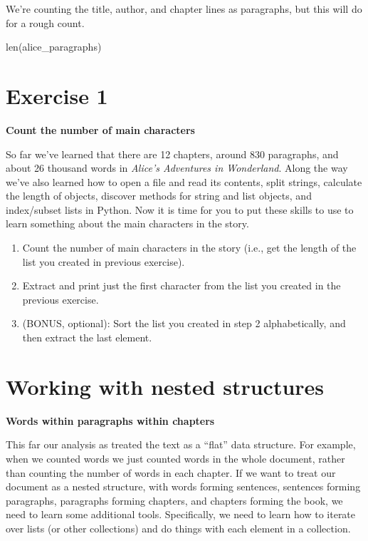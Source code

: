 \documentclass[]{book}
\newenvironment{Shaded}{\begin{snugshade}}{\end{snugshade}}
\newcommand{\BuiltInTok}[1]{#1}
\newcommand{\NormalTok}[1]{#1}
\begin{document}
We're counting the title, author, and chapter lines as paragraphs, but
this will do for a rough count.

\begin{Shaded}
\begin{Highlighting}[]
\BuiltInTok{len}\NormalTok{(alice_paragraphs)}
\end{Highlighting}
\end{Shaded}

\section{Exercise 1}\label{exercise-1-4}

\textbf{Count the number of main characters}

So far we've learned that there are 12 chapters, around 830 paragraphs,
and about 26 thousand words in \emph{Alice's Adventures in Wonderland}.
Along the way we've also learned how to open a file and read its
contents, split strings, calculate the length of objects, discover
methods for string and list objects, and index/subset lists in Python.
Now it is time for you to put these skills to use to learn something
about the main characters in the story.

\begin{enumerate}
\def\labelenumi{\arabic{enumi}.}
\item
  Count the number of main characters in the story (i.e., get the length
  of the list you created in previous exercise).
\item
  Extract and print just the first character from the list you created
  in the previous exercise.
\item
  (BONUS, optional): Sort the list you created in step 2 alphabetically,
  and then extract the last element.
\end{enumerate}

\section{Working with nested
structures}\label{working-with-nested-structures}

\textbf{Words within paragraphs within chapters}

This far our analysis as treated the text as a ``flat'' data structure.
For example, when we counted words we just counted words in the whole
document, rather than counting the number of words in each chapter. If
we want to treat our document as a nested structure, with words forming
sentences, sentences forming paragraphs, paragraphs forming chapters,
and chapters forming the book, we need to learn some additional tools.
Specifically, we need to learn how to iterate over lists (or other
collections) and do things with each element in a collection.
\end{document}

